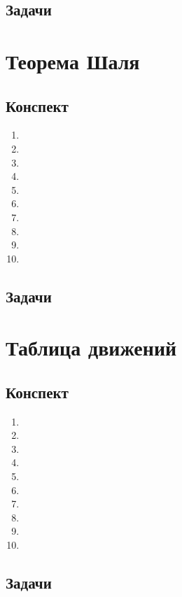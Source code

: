 \subsection{Задачи}




\section{Теорема Шаля}

\subsection{Конспект}
\begin{enumerate}\setlength{\itemsep}{1pt}
\item 
\item 
\item 
\item 
\item 
\item 
\item 
\item 
\item 
\item 
\end{enumerate}
\subsection{Задачи}




\section{Таблица движений}

\subsection{Конспект}
\begin{enumerate}\setlength{\itemsep}{1pt}
\item 
\item 
\item 
\item 
\item 
\item 
\item 
\item 
\item 
\item 
\end{enumerate}
\subsection{Задачи}




